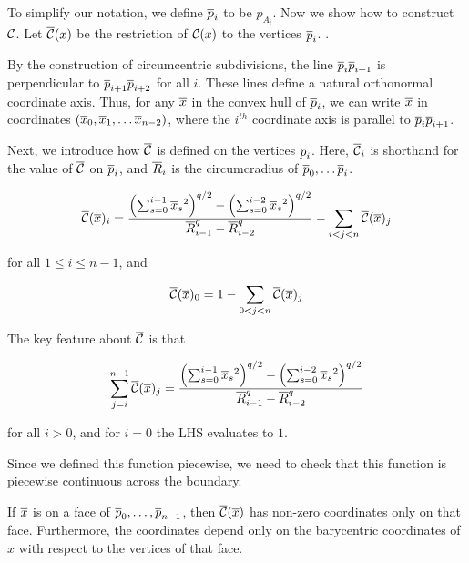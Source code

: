 To simplify our notation, we define $\overline{p}_i$ to be $p_{A_i}$. Now we show
how to construct $\mathcal{C}$. Let $\overline{\mathcal{C}}(x)$ be the restriction of $\mathcal{C}(x)$ to the
vertices $\overline{p}_i$. .



By the construction of circumcentric subdivisions, 
the line $\overline{p}_{i}\overline{p}_{i+1}$ is perpendicular to
$\overline{p}_{i+1}\overline{p}_{i+2}$ for all $i$. These lines define a natural
orthonormal coordinate axis. Thus,
for any $\overline{x}$ in the convex hull of $\overline{p}_i$, we can write $\overline{x}$ in
coordinates $(\overline{x}_0, \overline{x}_1, \ldots \overline{x}_{n-2})$, where the $i^{th}$ coordinate
axis is parallel to $\overline{p}_i \overline{p}_{i+1}$.

Next, we introduce how $\overline{\mathcal{C}}$ is defined on the vertices $\overline{p}_{i}$. Here,
$\overline{\mathcal{C}}_i$ is shorthand for the value of $\overline{\mathcal{C}}$ on $\overline{p}_{i}$, and $\overline{R}_i$
is the circumcradius of $\overline{p}_0, \ldots \overline{p}_{i}$.

\begin{align}
\overline{\mathcal{C}}(\overline{x})_i = \frac{
\left(\sum_{s=0}^{i-1} {\overline{x}_s}^2\right)^{q/2} -\left(\sum_{s=0}^{i-2}
{\overline{x}_s}^2\right)^{q/2}
}
{
\overline{R}_{i-1}^q - \overline{R}_{i-2}^q
} - \sum_{i < j < n} \overline{\mathcal{C}}(\overline{x})_j
\end{align}

for all $1 \leq i \leq n-1$, and 

\[ \overline{\mathcal{C}}(\overline{x})_0 = 1 - \sum_{0 < j < n} \overline{\mathcal{C}}(\overline{x})_j
\]

The key feature about $\overline{\mathcal{C}}$ is that

\[\sum_{j=i}^{n-1} \overline{\mathcal{C}}(\overline{x})_j= \frac{
\left(\sum_{s=0}^{i-1} {\overline{x}_s}^2\right)^{q/2} -\left(\sum_{s=0}^{i-2}
{\overline{x}_s}^2\right)^{q/2}
}
{
\overline{R}_{i-1}^q - \overline{R}_{i-2}^q
}\]

for all $i > 0$, and for $i = 0$ the LHS evaluates to $1$. 

Since we defined this function piecewise, we need to check that this
function is piecewise continuous across the boundary.

\begin{lemma}\label{lem:continuous}
If $\overline{x}$ is on a face of $\overline{p}_0, \ldots, \overline{p}_{n-1}$, then
$\overline{\mathcal{C}}(\overline{x})$ has non-zero coordinates only on that face. Furthermore, the
coordinates depend only on the barycentric coordinates of $x$ with respect
to the vertices of that face.
\end{lemma}

